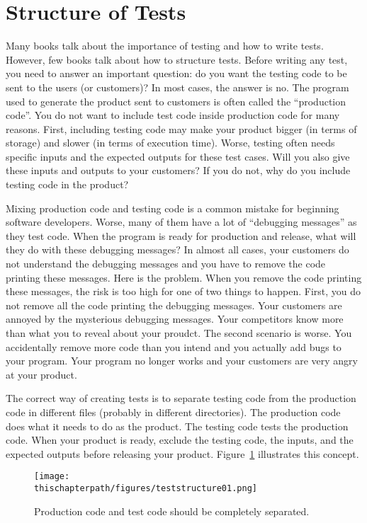 \section{Structure of Tests}

Many books talk about the importance of testing and how to write
tests.  However, few books talk about how to structure tests. Before
writing any test, you need to answer an important question: do you
want the testing code to be sent to the users (or customers)? In most
cases, the answer is no.  The program used to generate the product
sent to customers is often called the ``production code''.  You do not
want to include test code inside production code for many reasons.
First, including testing code may make your product bigger (in terms
of storage) and slower (in terms of execution time). Worse, testing
often needs specific inputs and the expected outputs for these test
cases.  Will you also give these inputs and outputs to your customers?
If you do not, why do you include testing code in the product?

Mixing production code and testing code is a common mistake for
beginning software developers. Worse, many of them have a lot of
``debugging messages'' as they test  code. When the program is
ready for production and release, what will they do with these
debugging messages?  In almost all cases, your customers do not
understand the debugging messages and you have to remove the code
printing these messages.  Here is the problem. When you remove the
code printing these messages, the risk is too high for one of two
things to happen. First, you do not remove all the code printing the
debugging messages.  Your customers are annoyed by the mysterious
debugging messages. Your competitors know more than what you to reveal
about your proudct.  The second scenario is worse.  You accidentally
remove more code than you intend and you actually add bugs to your
program.  Your program no longer works and your customers are very
angry at your product.

The correct way of creating tests is to separate testing code from the
production code in different files (probably in different
directories).  The production code does what it needs to do
as the product. The
testing code tests the production code.  When your product is ready,
exclude the testing code, the inputs, and the expected outputs before
releasing your product.  Figure~\ref{fig:teststructure01} illustrates
this concept.

\begin{figure}[h] \centering
{\texttt{[image: \\thischapterpath/figures/teststructure01.png]}}
\caption{Production code and test code should be completely separated.}
\label{fig:teststructure01}
\end{figure}

